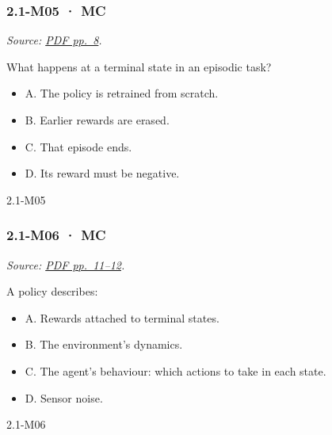 \noindent\begin{minipage}{\linewidth}

\subsubsection{2.1-M05 · MC}\label{m05-mc-3}

\emph{Source:
\href{../Lecture\%20Slides/2.1.\%20Introduction\%20to\%20Reinforcement\%20Learning.pdf\#page=8}{PDF
pp.~8}.}

What happens at a terminal state in an episodic task?

\begin{itemize}
\tightlist
\item
  A. The policy is retrained from scratch.
\item
  B. Earlier rewards are erased.
\item
  C. That episode ends.
\item
  D. Its reward must be negative.
\end{itemize}

\begin{solution}[8mm]{2.1-M05}

\end{solution}
\end{minipage}\par\medskip

\noindent\begin{minipage}{\linewidth}

\subsubsection{2.1-M06 · MC}\label{m06-mc-3}

\emph{Source:
\href{../Lecture\%20Slides/2.1.\%20Introduction\%20to\%20Reinforcement\%20Learning.pdf\#page=11}{PDF
pp.~11--12}.}

A policy describes:

\begin{itemize}
\tightlist
\item
  A. Rewards attached to terminal states.
\item
  B. The environment's dynamics.
\item
  C. The agent's behaviour: which actions to take in each state.
\item
  D. Sensor noise.
\end{itemize}

\begin{solution}[8mm]{2.1-M06}

\end{solution}
\end{minipage}\par\medskip

